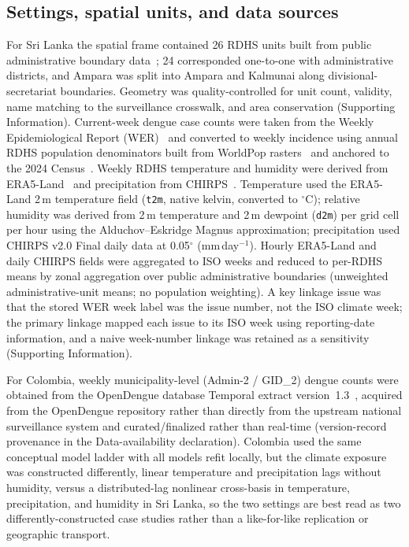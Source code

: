 \documentclass[11pt,a4paper]{article}
\begin{document}
\subsection{Settings, spatial units, and data sources}
For Sri Lanka the spatial frame contained 26 RDHS units built from public administrative boundary data~\cite{HDXCODABSriLanka}; 24 corresponded one-to-one with administrative districts, and Ampara was split into Ampara and Kalmunai along divisional-secretariat boundaries. Geometry was quality-controlled for unit count, validity, name matching to the surveillance crosswalk, and area conservation (Supporting Information). Current-week dengue case counts were taken from the Weekly Epidemiological Report (WER)~\cite{SriLankaWER} and converted to weekly incidence using annual RDHS population denominators built from WorldPop rasters~\cite{Tatem2017,WorldPop2025} and anchored to the 2024 Census~\cite{SriLankaCensus2025}. Weekly RDHS temperature and humidity were derived from ERA5-Land~\cite{MunozSabater2021,ERA5LandCDS} and precipitation from CHIRPS~\cite{Funk2015,CHIRPS}. Temperature used the ERA5-Land 2\,m temperature field (\texttt{t2m}, native kelvin, converted to $^{\circ}$C); relative humidity was derived from 2\,m temperature and 2\,m dewpoint (\texttt{d2m}) per grid cell per hour using the Alduchov--Eskridge Magnus approximation; precipitation used CHIRPS v2.0 Final daily data at 0.05$^{\circ}$ (mm\,day$^{-1}$). Hourly ERA5-Land and daily CHIRPS fields were aggregated to ISO weeks and reduced to per-RDHS means by zonal aggregation over public administrative boundaries (unweighted administrative-unit means; no population weighting). A key linkage issue was that the stored WER week label was the issue number, not the ISO climate week; the primary linkage mapped each issue to its ISO week using reporting-date information, and a naive week-number linkage was retained as a sensitivity (Supporting Information).

For Colombia, weekly municipality-level (Admin-2 / GID\_2) dengue counts were obtained from the OpenDengue database Temporal extract version~1.3~\cite{Clarke2024OpenDengue,OpenDengue2024}, acquired from the OpenDengue repository rather than directly from the upstream national surveillance system and curated/finalized rather than real-time (version-record provenance in the Data-availability declaration). Colombia used the same conceptual model ladder with all models refit locally, but the climate exposure was constructed differently, linear temperature and precipitation lags without humidity, versus a distributed-lag nonlinear cross-basis in temperature, precipitation, and humidity in Sri Lanka, so the two settings are best read as two differently-constructed case studies rather than a like-for-like replication or geographic transport.
\end{document}
